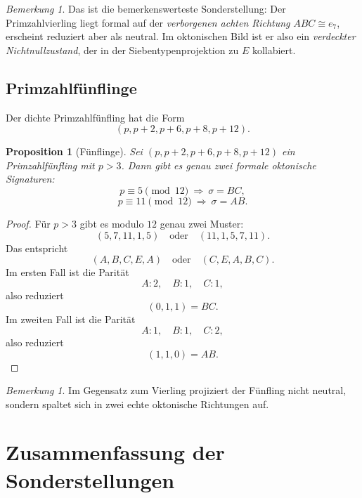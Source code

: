 \documentclass[11pt,a4paper]{article}
\newtheorem{proposition}[satz]{Proposition}
\theoremstyle{definition}
\theoremstyle{remark}
\newtheorem{bemerkung}[satz]{Bemerkung}
\newcommand{\sig}{\sigma}
\begin{document}
	\begin{bemerkung}
		Das ist die bemerkenswerteste Sonderstellung: Der Primzahlvierling liegt formal auf der
		\emph{verborgenen achten Richtung} \(ABC\cong e_7\), erscheint reduziert aber als neutral.
		Im oktonischen Bild ist er also ein \emph{verdeckter Nichtnullzustand}, der in der
		Siebentypenprojektion zu \(E\) kollabiert.
	\end{bemerkung}
	
	\subsection{Primzahlfünflinge}
	
	Der dichte Primzahlfünfling hat die Form
	\[
	(p,p+2,p+6,p+8,p+12).
	\]
	
	\begin{proposition}[Fünflinge]
		Sei \((p,p+2,p+6,p+8,p+12)\) ein Primzahlfünfling mit \(p>3\).
		Dann gibt es genau zwei formale oktonische Signaturen:
		\[
		p\equiv 5 \pmod{12}\ \Longrightarrow\ \sig = BC,
		\]
		\[
		p\equiv 11 \pmod{12}\ \Longrightarrow\ \sig = AB.
		\]
	\end{proposition}
	
	\begin{proof}
		Für \(p>3\) gibt es modulo \(12\) genau zwei Muster:
		\[
		(5,7,11,1,5)\quad\text{oder}\quad (11,1,5,7,11).
		\]
		Das entspricht
		\[
		(A,B,C,E,A)\quad\text{oder}\quad (C,E,A,B,C).
		\]
		Im ersten Fall ist die Parität
		\[
		A:2,\quad B:1,\quad C:1,
		\]
		also reduziert
		\[
		(0,1,1)=BC.
		\]
		Im zweiten Fall ist die Parität
		\[
		A:1,\quad B:1,\quad C:2,
		\]
		also reduziert
		\[
		(1,1,0)=AB.
		\]
	\end{proof}
	
	\begin{bemerkung}
		Im Gegensatz zum Vierling projiziert der Fünfling nicht neutral, sondern spaltet sich
		in zwei echte oktonische Richtungen auf.
	\end{bemerkung}
	
	\section{Zusammenfassung der Sonderstellungen}
	
\end{document}
